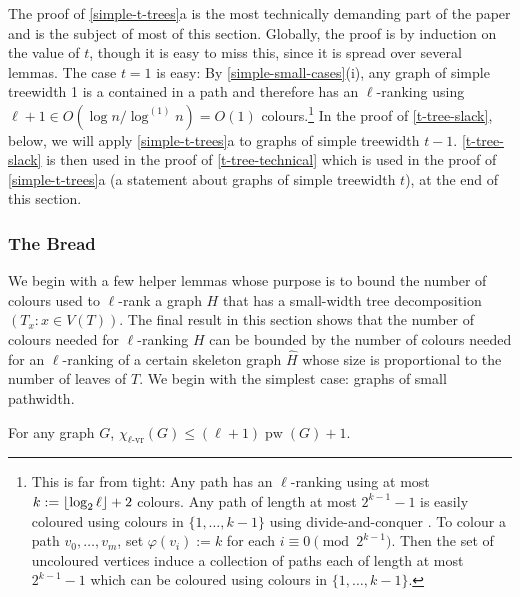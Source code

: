 \documentclass[kpfonts]{patmorin}
\DeclareMathOperator{\pw}{pw}
\newcommand{\rn}[1]{\chi_{\operatorname{#1-vr}}}
\newcommand{\lrn}{\rn{\ell}}
\theoremstyle{named}
\newcommand{\weirdref}[2]{\cref{#1}#2}
\begin{document}
The proof of \weirdref{simple-t-trees}{a} is the most technically demanding part of the paper and is the subject of most of this section.  Globally, the proof is by induction on the value of $t$, though it is easy to miss this, since it is spread over several lemmas. The case $t=1$ is easy: By \cref{simple-small-cases}(i), any graph of simple treewidth 1 is a contained in a path and therefore has an $\ell$-ranking using $\ell+1\in O(\log n/\log^{(1)} n) = O(1)$ colours.\footnote{\label{logarithmic-base-case}This is far from tight: Any path has an $\ell$-ranking using at most $k:={\lfloor \log_2 \ell \rfloor}+2$ colours.  Any path of length at most $2^{k-1}-1$ is easily coloured using colours in $\{1,\ldots,k-1\}$ using divide-and-conquer \cite{nesetril.ossona:tree-depth}.  To colour a path $v_0,\ldots,v_m$, set $\varphi(v_i):=k$ for each $i\equiv 0\pmod{2^{k-1}}$.  Then the set of uncoloured vertices induce a collection of paths each of length at most $2^{k-1}-1$ which can be coloured using colours in $\{1,\ldots,k-1\}$.}  In the proof of \cref{t-tree-slack}, below, we will apply \weirdref{simple-t-trees}{a} to graphs of simple treewidth $t-1$. \cref{t-tree-slack} is then used in the proof of \cref{t-tree-technical} which is used in the proof of \weirdref{simple-t-trees}{a} (a statement about graphs of simple treewidth $t$), at the end of this section.

\subsubsection{The Bread}

We begin with a few helper lemmas whose purpose is to bound the number of colours used to $\ell$-rank a graph $H$ that has a small-width tree decomposition $(T_x:x\in V(T))$.  The final result in this section shows that the number of colours needed for $\ell$-ranking $H$ can be bounded by the number of colours needed for an $\ell$-ranking of a certain skeleton graph $\hat{H}$ whose size is proportional to the number of leaves of $T$. We begin with the simplest case: graphs of small pathwidth.

\begin{lem}\label{pathwidth}
    For any graph $G$, $\lrn(G)\le (\ell+1)\pw(G) + 1$.
\end{lem}
\end{document}
